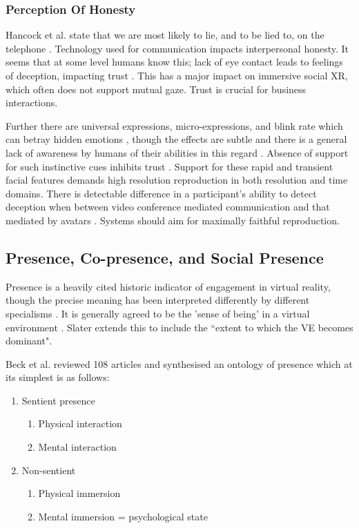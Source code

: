 \subsubsection{Perception Of Honesty}
Hancock et al. state that we are most likely to lie, and to be lied to, on the telephone \cite{Hancock2004}. Technology used for communication impacts interpersonal honesty. It seems that at some level humans know this; lack of eye contact leads to feelings of deception, impacting trust \cite{Holm2010}. This has a major impact on immersive social XR, which often does not support mutual gaze. Trust is crucial for business interactions.\par
Further there are universal expressions, micro-expressions, and blink rate which can betray hidden emotions \cite{Porter2008}, though the effects are subtle and there is a general lack of awareness by humans of their abilities in this regard \cite{Holm2010}. Absence of support for such instinctive cues inhibits trust \cite{Roberts2015}. Support for these rapid and transient facial features demands high resolution reproduction in both resolution and time domains. There is detectable difference in a participant's ability to detect deception when between video conference mediated communication and that mediated by avatars \cite{Steptoe2010}. Systems should aim for maximally faithful reproduction. 
        \subsection{Presence, Co-presence, and Social Presence}
            Presence is a heavily cited historic indicator of engagement in virtual reality, though the precise meaning has been interpreted differently by different specialisms \cite{Beck2011, Schuemie2001}. It is generally agreed to be the 'sense of being' in a virtual environment \cite{Slater1999}. Slater extends this to include the ``extent to which the VE becomes dominant". \par
Beck et al. reviewed 108 articles and synthesised an ontology of presence \cite{Beck2011} which at its simplest is as follows:
            \begin{enumerate}
				\item Sentient presence
                    \begin{enumerate}
                     \item Physical interaction
                      \item Mental interaction
                    \end{enumerate}
                   \item Non-sentient
                   \begin{enumerate}
                       \item Physical immersion
                       \item Mental immersion = psychological state
                     \end{enumerate}
            \end{enumerate}
            
